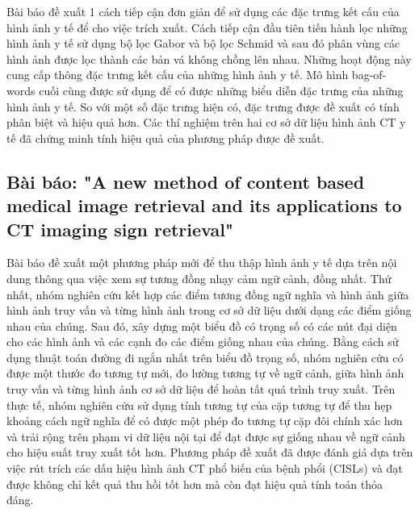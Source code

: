 \documentclass[a4paper,14pt]{extreport}
\begin{document}
Bài báo đề xuất 1 cách tiếp cận đơn giản để sử dụng các đặc trưng kết cấu của hình ảnh y tế để cho việc trích xuất. Cách tiếp cận đầu tiên tiến hành lọc những hình ảnh y tế sử dụng bộ lọc Gabor và bộ lọc Schmid và sau đó phân vùng các hình ảnh được lọc thành các bản vá không chồng lên nhau. Những hoạt động này cung cấp thông đặc trưng kết cấu của những hình ảnh y tế. Mô hình bag-of-words cuối cùng được sử dụng để có được những biểu diễn đặc trưng của những hình ảnh y tế. So với một số đặc trưng hiện có, đặc trưng được đề xuất có tính phân biệt và hiệu quả hơn. Các thí nghiệm trên hai cơ sở dữ liệu hình ảnh CT y tế đã chứng minh tính hiệu quả của phương pháp được đề xuất.

\subsection{Bài báo: "A new method of content based medical image retrieval and its applications to CT imaging sign retrieval" \cite{paper-3}}

Bài báo đề xuất một phương pháp mới để thu thập hình ảnh y tế dựa trên nội dung thông qua việc xem sự tương đồng nhạy cảm ngữ cảnh, đồng nhất. Thứ nhất, nhóm nghiên cứu kết hợp các điểm tương đồng ngữ nghĩa và hình ảnh giữa hình ảnh truy vấn và từng hình ảnh trong cơ sở dữ liệu dưới dạng các điểm giống nhau của chúng. Sau đó, xây dựng một biểu đồ có trọng số có các nút đại diện cho các hình ảnh và các cạnh đo các điểm giống nhau của chúng. Bằng cách sử dụng thuật toán đường đi ngắn nhất trên biểu đồ trọng số, nhóm nghiên cứu có được một thước đo tương tự mới, đo lường tương tự về ngữ cảnh, giữa hình ảnh truy vấn và từng hình ảnh cơ sở dữ liệu để hoàn tất quá trình truy xuất. Trên thực tế, nhóm nghiên cứu sử dụng tính tương tự của cặp tương tự để thu hẹp khoảng cách ngữ nghĩa để có được một phép đo tương tự cặp đôi chính xác hơn và trải rộng trên phạm vi dữ liệu nội tại để đạt được sự giống nhau về ngữ cảnh cho hiệu suất truy xuất tốt hơn. Phương pháp đề xuất đã được đánh giá dựa trên việc rút trích các dấu hiệu hình ảnh CT phổ biến của bệnh phổi (CISLs) và đạt được không chỉ kết quả thu hồi tốt hơn mà còn đạt hiệu quả tính toán thỏa đáng.
\end{document}

